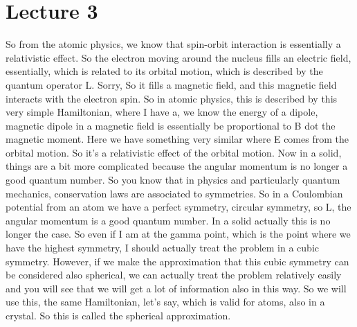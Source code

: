 \chapter{Lecture 3}
So from the atomic physics, we know that spin-orbit interaction is essentially a relativistic effect. So the electron moving around the nucleus fills an electric field, essentially, which is related to its orbital motion, which is described by the quantum operator L. Sorry, So it fills a magnetic field, and this magnetic field interacts with the electron spin. So in atomic physics, this is described by this very simple Hamiltonian, where I have a, we know the energy of a dipole, magnetic dipole in a magnetic field is essentially be proportional to B dot the magnetic moment. Here we have something very similar where E comes from the orbital motion. So it's a relativistic effect of the orbital motion. Now in a solid, things are a bit more complicated because the angular momentum is no longer a good quantum number. So you know that in physics and particularly quantum mechanics, conservation laws are associated to symmetries. So in a Coulombian potential from an atom we have a perfect symmetry, circular symmetry, so L, the angular momentum is a good quantum number. In a solid actually this is no longer the case. So even if I am at the gamma point, which is the point where we have the highest symmetry, I should actually treat the problem in a cubic symmetry. However, if we make the approximation that this cubic symmetry can be considered also spherical, we can actually treat the problem relatively easily and you will see that we will get a lot of information also in this way. So we will use this, the same Hamiltonian, let's say, which is valid for atoms, also in a crystal. So this is called the spherical approximation.
